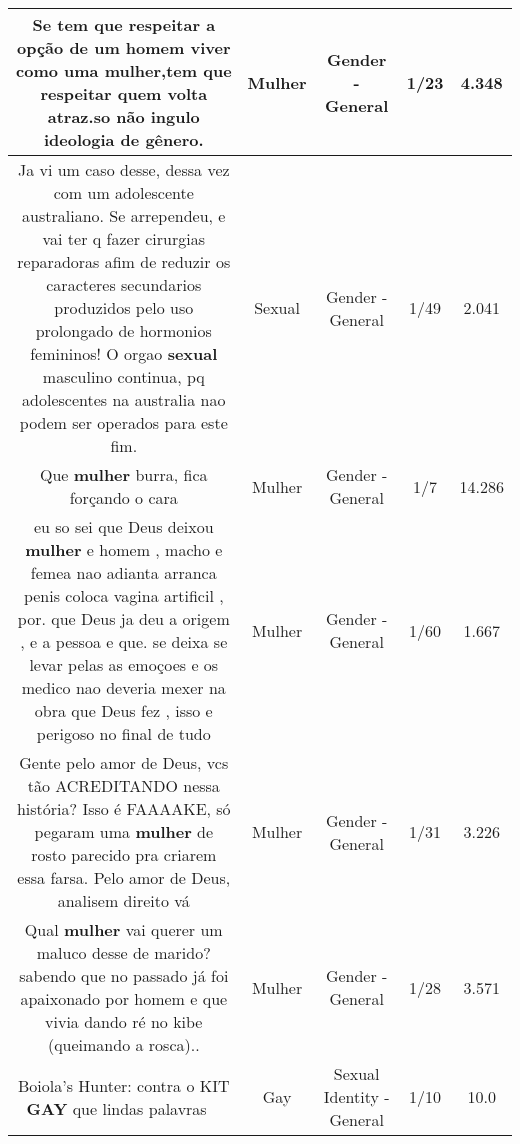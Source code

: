\documentclass[11pt]{article}
\newlength\mylength
\begin{document}
\begin{center}
\begin{longtable}{|C{.65\mylength}|C{.30\mylength}|C{.12\mylength}|C{.12\mylength}|C{.12\mylength}|}
  \small Se tem que respeitar a opção de um homem viver como uma \textbf{mulher},tem que respeitar quem volta atraz.so não ingulo ideologia de gênero.\normalsize   & Mulher & Gender - General & 1/23 & 4.348 \\  \hline
  \small Ja vi um caso desse, dessa vez com um adolescente australiano. Se arrependeu, e vai ter q fazer cirurgias reparadoras afim de reduzir os caracteres secundarios produzidos pelo uso prolongado de hormonios femininos! O orgao \textbf{sexual} masculino continua, pq adolescentes na australia nao podem ser operados para este fim.\normalsize   & Sexual & Gender - General & 1/49 & 2.041 \\  \hline
  \small Que \textbf{mulher} burra, fica forçando o cara\normalsize   & Mulher & Gender - General & 1/7 & 14.286 \\  \hline
  \small eu so sei que Deus deixou \textbf{mulher} e homem , macho e femea  nao adianta arranca penis  coloca vagina artificil , por. que Deus ja deu a origem , e a pessoa e que. se deixa se levar pelas as emoçoes e os medico nao deveria mexer na obra que Deus fez , isso e perigoso no final de tudo\normalsize   & Mulher & Gender - General & 1/60 & 1.667 \\  \hline
  \small Gente pelo amor de Deus, vcs tão ACREDITANDO nessa história? Isso é FAAAAKE, só pegaram uma \textbf{mulher} de rosto parecido pra criarem essa farsa. Pelo amor de Deus, analisem direito vá\normalsize   & Mulher & Gender - General & 1/31 & 3.226 \\  \hline
  \small Qual \textbf{mulher} vai querer um maluco desse de marido? sabendo que no passado já foi apaixonado por homem e que vivia dando ré no kibe (queimando a rosca)..\normalsize   & Mulher & Gender - General & 1/28 & 3.571 \\  \hline
  \small Boiola's Hunter: contra o KIT \textbf{GAY} que lindas palavras 👏👏\normalsize   & Gay & Sexual Identity - General & 1/10 & 10.0 \\  \hline

\end{longtable}
\end{center}
\end{document}

